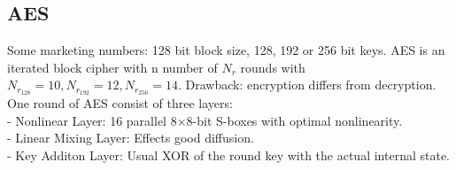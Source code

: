 \begin{minipage}{10cm}
\subsection{AES}
Some marketing numbers: 128 bit block size, 128, 192 or 256 bit keys. AES is an iterated block cipher with n number of $N_r$ rounds
with $N_{r_{128}}=10, N_{r_{192}}=12, N_{r_{256}}=14$. Drawback: encryption differs from decryption.\\
One round of AES consist of three layers:\\
- Nonlinear Layer: 16 parallel 8$\times$8-bit S-boxes with optimal nonlinearity.\\
- Linear Mixing Layer: Effects good diffusion.\\
- Key Additon Layer: Usual XOR of the round key with the actual internal state.\\

\end{minipage}
\hspace{5mm}
